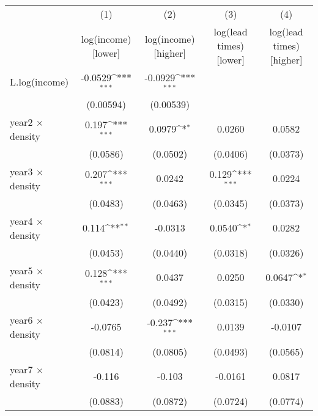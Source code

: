 {
\def\sym#1{\ifmmode^{#1}\else\(^{#1}\)\fi}
\begin{tabular}{l*{4}{c}}
\toprule
            &\multicolumn{1}{c}{(1)}&\multicolumn{1}{c}{(2)}&\multicolumn{1}{c}{(3)}&\multicolumn{1}{c}{(4)}\\
            &\multicolumn{1}{c}{log(income) [lower]}&\multicolumn{1}{c}{log(income) [higher]}&\multicolumn{1}{c}{log(lead times) [lower]}&\multicolumn{1}{c}{log(lead times) [higher]}\\
\midrule
L.log(income) &     -0.0529\sym{***}&     -0.0929\sym{***}&                     &                     \\
            &   (0.00594)         &   (0.00539)         &                     &                     \\
\addlinespace
year2 $\times$ density&       0.197\sym{***}&      0.0979\sym{*}  &      0.0260         &      0.0582         \\
            &    (0.0586)         &    (0.0502)         &    (0.0406)         &    (0.0373)         \\
\addlinespace
year3 $\times$ density&       0.207\sym{***}&      0.0242         &       0.129\sym{***}&      0.0224         \\
            &    (0.0483)         &    (0.0463)         &    (0.0345)         &    (0.0373)         \\
\addlinespace
year4 $\times$ density&       0.114\sym{**} &     -0.0313         &      0.0540\sym{*}  &      0.0282         \\
            &    (0.0453)         &    (0.0440)         &    (0.0318)         &    (0.0326)         \\
\addlinespace
year5 $\times$ density&       0.128\sym{***}&      0.0437         &      0.0250         &      0.0647\sym{*}  \\
            &    (0.0423)         &    (0.0492)         &    (0.0315)         &    (0.0330)         \\
\addlinespace
year6 $\times$ density&     -0.0765         &      -0.237\sym{***}&      0.0139         &     -0.0107         \\
            &    (0.0814)         &    (0.0805)         &    (0.0493)         &    (0.0565)         \\
\addlinespace
year7 $\times$ density&      -0.116         &      -0.103         &     -0.0161         &      0.0817         \\
            &    (0.0883)         &    (0.0872)         &    (0.0724)         &    (0.0774)         \\

\end{tabular}}
